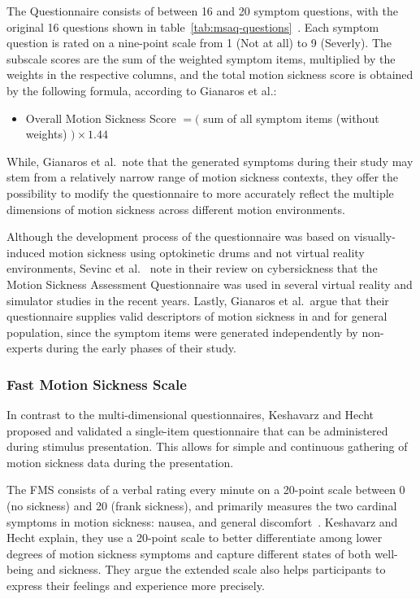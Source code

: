 The Questionnaire consists of between 16 and 20 symptom questions, with the original 16 questions shown in
table~\ref{tab:msaq-questions}~\cite{Gianaros2001,Sevinc2020}.
Each symptom question is rated on a nine-point scale from 1 (Not at all) to 9 (Severly).
The subscale scores are the sum of the weighted symptom items, multiplied by the weights in the respective columns, and
the total motion sickness score is obtained by the following formula, according to Gianaros et al.:
\begin{itemize}
    \item Overall Motion Sickness Score $= ($ sum of all symptom items (without weights) $) \times 1.44$
\end{itemize}
While, Gianaros et al.\ note that the generated symptoms during their study may stem from a relatively narrow range
of motion sickness contexts, they offer the possibility to modify the questionnaire to more accurately reflect the
multiple dimensions of motion sickness across different motion environments.

Although the development process of the questionnaire was based on visually-induced motion sickness using optokinetic
drums and not virtual reality environments, Sevinc et al.~\cite{Sevinc2020} note in their review on cybersickness
that the Motion Sickness Assessment Questionnaire was used in several virtual reality and simulator studies in the
recent years.
Lastly, Gianaros et al.\ argue that their questionnaire supplies valid descriptors of motion sickness in and for
general population, since the symptom items were generated independently by non-experts during the early phases of
their study.


\subsubsection{Fast Motion Sickness Scale}\label{subsubsec:fast-motion-sickness-scale}

In contrast to the multi-dimensional questionnaires, Keshavarz and Hecht~\cite{Keshavarz2011} proposed and validated
a single-item questionnaire that can be administered during stimulus presentation.
This allows for simple and continuous gathering of motion sickness data during the presentation.

The FMS consists of a verbal rating every minute on a 20-point scale between 0 (no sickness) and 20 (frank sickness),
and primarily measures the two cardinal symptoms in motion sickness: nausea, and general
discomfort~\cite{Keshavarz2011}.
Keshavarz and Hecht explain, they use a 20-point scale to better differentiate among lower
degrees of motion sickness symptoms and capture different states of both well-being and sickness.
They argue the extended scale also helps participants to express their feelings and experience more precisely.

